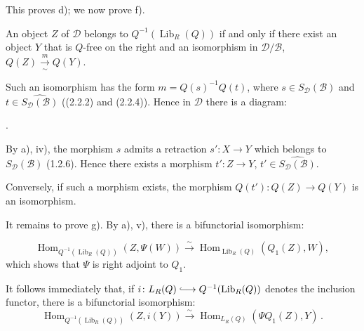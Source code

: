 \clearpage
{}%
\begingroup
\small
\setlength{\parskip}{0pt}%
\setlength{\emergencystretch}{1.5em}%
\setlength{\abovedisplayskip}{3pt plus 1pt minus 1pt}%
\setlength{\belowdisplayskip}{3pt plus 1pt minus 1pt}%

\noindent This proves d); we now prove f).

An object $Z$ of $\mathcal D$ belongs to
$Q^{-1}(\operatorname{Lib}_R(Q))$ if and only if there exist an object $Y$
that is $Q$-free on the right and an isomorphism in
$\mathcal D/\mathcal B$, $Q(Z)\xrightarrow[\sim]{m}Q(Y)$.

Such an isomorphism has the form $m=Q(s)^{-1}Q(t)$, where
$s\in S_{\mathcal D}(\mathcal B)$ and
$t\in\widehat{S_{\mathcal D}(\mathcal B)}$ ((2.2.2) and (2.2.4)). Hence
in $\mathcal D$ there is a diagram:

\begin{center}
  \quad .
\end{center}

By a), iv), the morphism $s$ admits a retraction
$s'\colon X\longrightarrow Y$ which belongs to
$S_{\mathcal D}(\mathcal B)$ (1.2.6). Hence there exists a morphism
$t'\colon Z\longrightarrow Y$,
$t'\in\widehat{S_{\mathcal D}(\mathcal B)}$.

Conversely, if such a morphism exists, the morphism
$Q(t')\colon Q(Z)\longrightarrow Q(Y)$ is an isomorphism.

It remains to prove g). By a), v), there is a bifunctorial isomorphism:

\[
  \operatorname{Hom}_{Q^{-1}(\operatorname{Lib}_R(Q))}(Z,\Psi(W))
  \xrightarrow{\sim}
  \operatorname{Hom}_{\operatorname{Lib}_R(Q)}(Q_1(Z),W),
\]
which shows that $\Psi$ is right adjoint to $Q_1$.

It follows immediately that, if
$i\colon L_R(Q)\lhook\joinrel\longrightarrow
Q^{-1}(\operatorname{Lib}_R(Q))$ denotes the inclusion functor, there is a
bifunctorial isomorphism:
\[
  \operatorname{Hom}_{Q^{-1}(\operatorname{Lib}_R(Q))}(Z,i(Y))
  \xrightarrow{\sim}
  \operatorname{Hom}_{L_R(Q)}(\Psi Q_1(Z),Y)\, .
\]

